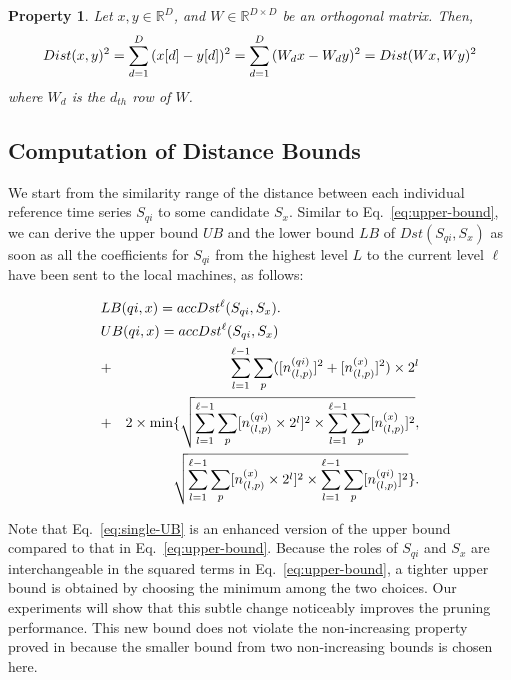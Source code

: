 \newtheorem{ProOfOrthogonal}{\bf Property}
\begin{ProOfOrthogonal}
Let $x, y\in\mathbb{R}^{D}$, and $W\in\mathbb{R}^{D\times D}$ be an orthogonal matrix. Then,
\[
Dist(x,y)^2=\sum^D_{d=1}{(x[d]-y[d])^2} \\
=\sum^D_{d=1}{(W_dx-W_dy)^2}=Dist(Wx,Wy)^2
\]
where $W_d$ is the $d_{th}$ row of $W$.
\end{ProOfOrthogonal}

\subsection{Computation of Distance Bounds}\label{subsec:newbounds}

We start from the similarity range of the distance between each
individual reference time series $S_{qi}$ to some candidate
$S_x$. Similar to Eq.~\eqref{eq:upper-bound}, we can derive the upper
bound $UB$ and the lower bound $LB$ of $Dst(S_{qi},S_x)$ as soon as all the
coefficients for $S_{qi}$ from the highest level $L$ to the current level
$\ell$ have been sent to the local machines, as follows:

{\small
\begin{eqnarray}
\lefteqn{LB(qi,x) =  accDst^{\ell}(S_{qi},S_{x}).} \label{eq:single-LB} \\
\lefteqn{UB(qi,x) = accDst^{\ell }(S_{qi},S_{x})} \notag \\
& + & \sum_{l=1}^{\ell-1}
 \sum_{p}([n_{(l,p)}^{(qi)}]^{2}+[n_{(l,p)}^{(x)}]^{2}) \times 2^{l} \notag \\
& + & 2 \times \min\{\sqrt{\sum_{l=1}^{\ell-1}\sum_{p}[n_{(l,p)}^{(qi)}
 \times 2^{l}]^{2} \times \sum_{l=1}^{\ell-1}\sum_{p}[n_{(l,p)}^{(x)}]^{2}},
   \notag \\
&&\sqrt{\sum_{l=1}^{\ell-1}\sum_{p}[n_{(l,p)}^{(x)} \times 2^{l}]^{2} \times 
        \sum_{l=1}^{\ell-1}\sum_{p}[n_{(l,p)}^{(qi)}]^{2}}\}.
 \label{eq:single-UB}
\end{eqnarray}
}

Note that Eq.~\eqref{eq:single-UB} is an enhanced version of the upper
bound compared to that in Eq.~\eqref{eq:upper-bound}. Because the
roles of $S_{qi}$ and $S_x$ are interchangeable in the squared terms
in Eq.~\eqref{eq:upper-bound}, a tighter upper bound is obtained by
choosing the minimum among the two choices.  Our experiments will show
that this subtle change noticeably improves the pruning
performance. This new bound does not violate the non-increasing
property proved in \cite{Yeh:2008:LLD} because the smaller bound from
two non-increasing bounds is chosen here.

